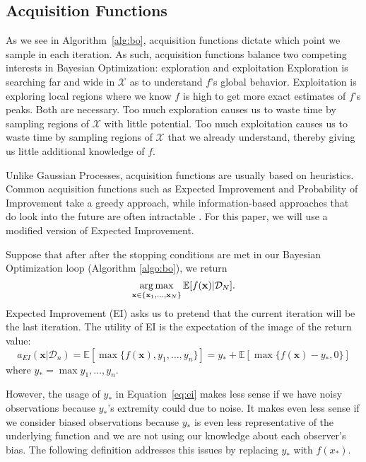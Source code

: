 \subsection{Acquisition Functions}
As we see in Algorithm~\ref{alg:bo}, acquisition functions dictate which point we sample in each iteration.
As such, acquisition functions balance two competing interests in Bayesian Optimization: exploration and exploitation Exploration is searching far and wide in $\mathcal{X}$ as to understand $f$'s global behavior.
Exploitation is exploring local regions where we know $f$ is high to get more exact estimates of $f$'s peaks.
Both are necessary.
Too much exploration causes us to waste time by sampling regions of $\mathcal{X}$ with little potential.
Too much exploitation causes us to waste time by sampling regions of $\mathcal{X}$ that we already understand, thereby giving us little additional knowledge of $f$.

Unlike Gaussian Processes, acquisition functions are usually based on heuristics.
Common acquisition functions such as Expected Improvement and Probability of Improvement take a greedy approach, while information-based approaches that do look into the future are often intractable \cite{shahriari2016}.
For this paper, we will use a modified version of Expected Improvement.

Suppose that after after the stopping conditions are met in our Bayesian Optimization loop (Algorithm \ref{algo:bo}),
we return
\begin{equation*}
    \operatorname*{arg\,max}_{\mathbf{x} \in \{ \mathbf{x}_1, \ldots, \mathbf{x}_N \}} \mathbb{E}[f(\mathbf{x}) | \mathcal{D}_N].
\end{equation*}
Expected Improvement (EI) asks us to pretend that the current iteration will be the last iteration.
The utility of EI is the expectation of the image of the return value:
\begin{equation}
    \label{eq:ei}
    a_{EI}(\mathbf{x} | \mathcal{D}_n) = \mathbb{E}[\max\{f(\mathbf{x}), y_1, \ldots, y_n\}]
    = y_* + \mathbb{E}[\max\{f(\mathbf{x}) - y_*, 0\}]
\end{equation}
where $y_* = \max{y_1, \ldots, y_n}$.

However, the usage of $y_*$ in Equation~\ref{eq:ei} makes less sense if we have noisy observations because $y_*$'s extremity could due to noise.
It makes even less sense if we consider biased observations because $y_*$ is even less representative of the underlying function and we are not using our knowledge about each observer's bias.
The following definition addresses this issues by replacing $y_*$ with $f(x_*)$.

